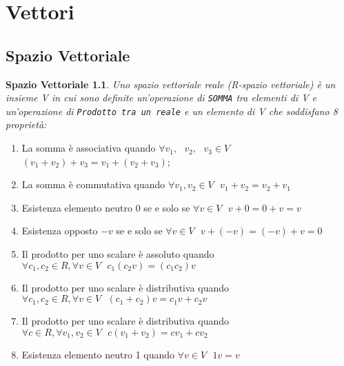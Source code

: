\chapter{Vettori}
\section{Spazio Vettoriale}
\newtheorem{SpaVet}{Spazio Vettoriale}
\begin{SpaVet}
	Uno spazio vettoriale reale (R-spazio vettoriale) è un insieme \textit{V} in
	cui sono definite un'operazione di \texttt{SOMMA} tra elementi di
	\textit{V} e un'operazione di \texttt{Prodotto tra un reale} e un elemento
	di V che soddisfano 8 proprietà:
\end{SpaVet}
\begin{enumerate}
	\item La somma è associativa quando $\forall v_1, \text{ } v_2, \text{ } v_3 
		\in V$ $\left(v_1+v_2\right)+v_3=v_1+\left(v_2+v_3\right)$;
	\item La somma è commutativa quando $\forall v_1, v_2 \in V\text{ }
		v_1+v_2=v_2+v_1$
	\item Esistenza elemento neutro 0 se e solo se $\forall v\in V \text{ }
		v+0=0+v=v$
	\item Esistenza opposto $-v$ se e solo se $\forall v \in V \text{ }
		v+(-v)=(-v)+v=0$
	\item Il prodotto per uno scalare è assoluto quando $\forall c_1,c_2 \in
		R, \forall v\in V \text{ } c_1(c_2v)=(c_1c_2)v$
	\item Il prodotto per uno scalare è distributiva quando $\forall c_1,c_2 \in
		R, \forall v\in V \text{ } (c_1+c_2)v=c_1v+c_2v$
	\item Il prodotto per uno scalare è distributiva quando $\forall c \in
		R, \forall v_1, v_2\in V \text{ }c(v_1+v_2)=cv_1+cv_2$
	\item Esistenza elemento neutro 1 quando $\forall v\in V \text{ } 1v=v$
\end{enumerate}
